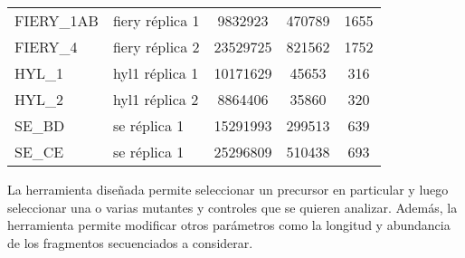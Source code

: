\begin{table}[]
\begin{tabular}{llccc}
        FIERY\_1AB                               & fiery réplica 1                          & 9832923                                                                  & 470789                                                                                     & 1655                                                                                              \\
        FIERY\_4                                 & fiery réplica 2                          & 23529725                                                                 & 821562                                                                                     & 1752                                                                                              \\
        HYL\_1                                   & hyl1 réplica 1                           & 10171629                                                                 & 45653                                                                                      & 316                                                                                               \\
        HYL\_2                                   & hyl1 réplica 2                           & 8864406                                                                  & 35860                                                                                      & 320                                                                                               \\
        SE\_BD                                   & se réplica 1                             & 15291993                                                                 & 299513                                                                                     & 639                                                                                               \\
        SE\_CE                                   & se réplica 1                             & 25296809                                                                 & 510438                                                                                     & 693                                                                                              
    \end{tabular}
\end{table}

La herramienta diseñada permite seleccionar un precursor en particular y luego seleccionar una o varias mutantes y controles que se quieren analizar.
Además, la herramienta permite modificar otros parámetros como la longitud y abundancia de los fragmentos secuenciados a considerar.

